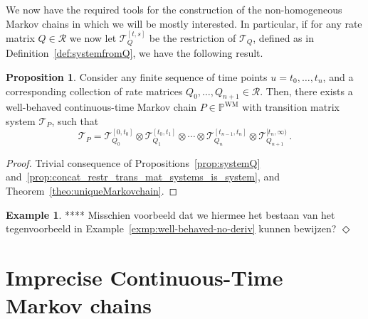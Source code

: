 \documentclass[10pt]{paper}
\theoremstyle{definition}
\newtheorem{exmp}{Example}%
\newtheorem{proposition}[theorem]{Proposition}
\newcommand{\reals}{\mathbb{R}}
\newcommand{\realsnonneg}{\reals_{\geq 0}}
\newcommand{\processes}{\mathbb{P}}
\newcommand{\wmprocesses}{\processes^{\mathrm{WM}}}
\newcommand{\exampleend}{\hfill$\Diamond$}
\begin{document}
We now have the required tools for the construction of the non-homogeneous Markov chains in which we will be mostly interested. In particular, if for any rate matrix $Q\in\mathcal{R}$ we now let $\mathcal{T}_Q^{[t,s]}$ be the restriction of $\mathcal{T}_Q$, defined as in Definition~\ref{def:systemfromQ}, we have the following result.

\begin{proposition}\label{prop:finite_different_rate_matrix_has_process}
Consider any finite sequence of time points $u=t_0,\ldots,t_n$, and a corresponding collection of rate matrices $Q_0,\ldots,Q_{n+1}\in\mathcal{R}$. Then, there exists a well-behaved continuous-time Markov chain $P\in\wmprocesses$ with transition matrix system $\mathcal{T}_P$, such that
\begin{equation*}
\mathcal{T}_P = \mathcal{T}_{Q_0}^{[0,t_0]}\otimes \mathcal{T}_{Q_1}^{[t_0,t_1]} \otimes \cdots \otimes \mathcal{T}_{Q_n}^{[t_{n-1},t_n]} \otimes \mathcal{T}_{Q_{n+1}}^{[t_n,\infty)}\,.
\end{equation*}
\end{proposition}
\begin{proof}
Trivial consequence of Propositions~\ref{prop:systemQ} and~\ref{prop:concat_restr_trans_mat_systems_is_system}, and Theorem~\ref{theo:uniqueMarkovchain}.
\end{proof}

\begin{exmp}
**** Misschien voorbeeld dat we hiermee het bestaan van het tegenvoorbeeld in Example~\ref{exmp:well-behaved-no-deriv} kunnen bewijzen?
\exampleend
\end{exmp}



\section{Imprecise Continuous-Time Markov chains}
\label{sec:iCTMC}
\end{document}
